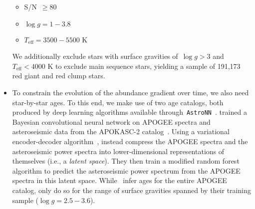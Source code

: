 \begin{itemize}
\begin{itemize}
		\item S/N~$\geq 80$

		\item $\log g = 1 - 3.8$

		\item $T_\text{eff} = 3500 - 5500$ K

	\end{itemize}
	We additionally exclude stars with surface gravities of~$\log g > 3$ and
	$T_\text{eff} < 4000$ K to exclude main sequence stars, yielding a sample
	of 191,173 red giant and red clump stars.

	\item To constrain the evolution of the abundance gradient over time, we
	also need star-by-star ages.
	To this end, we make use of two age catalogs, both produced by deep
	learning algorithms available through~\texttt{AstroNN}~\citep{Leung2019}.
	\citet{Mackereth2019b} trained a Bayesian convolutional neural network on
	APOGEE spectra and asteroseismic data from the APOKASC-2
	catalog~\citep{Pinsonneault2018}.
	Using a variational encoder-decoder algorithm~\citep[e.g.,][]{LeCun2015},
	\citet{Leung2023} instead compress the APOGEE spectra and the asteroseismic
	power spectra into lower-dimensional representations of themselves (i.e., a
	\textit{latent space}).
	They then train a modified random forest algorithm to predict the
	asteroseismic power spectrum from the APOGEE spectra in this latent space.
	While~\citet{Mackereth2019b} infer ages for the entire APOGEE catalog,
	\citet{Leung2023} only do so for the range of surface gravities spanned by
	their training sample ($\log g = 2.5 - 3.6$).

\end{itemize}
